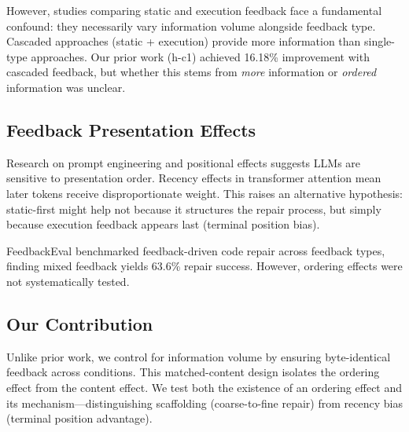 However, studies comparing static and execution feedback face a fundamental confound: they necessarily vary information volume alongside feedback type. Cascaded approaches (static + execution) provide more information than single-type approaches. Our prior work (h-c1) achieved 16.18\% improvement with cascaded feedback, but whether this stems from \emph{more} information or \emph{ordered} information was unclear.

\subsection{Feedback Presentation Effects}

Research on prompt engineering and positional effects suggests LLMs are sensitive to presentation order. Recency effects in transformer attention mean later tokens receive disproportionate weight. This raises an alternative hypothesis: static-first might help not because it structures the repair process, but simply because execution feedback appears last (terminal position bias).

FeedbackEval \citep{dai2025feedbackeval} benchmarked feedback-driven code repair across feedback types, finding mixed feedback yields 63.6\% repair success. However, ordering effects were not systematically tested.

\subsection{Our Contribution}

Unlike prior work, we control for information volume by ensuring byte-identical feedback across conditions. This matched-content design isolates the ordering effect from the content effect. We test both the existence of an ordering effect and its mechanism---distinguishing scaffolding (coarse-to-fine repair) from recency bias (terminal position advantage).
